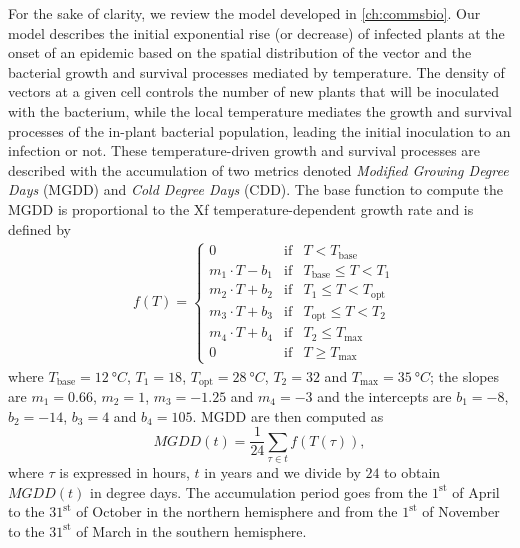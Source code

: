 For the sake of clarity, we review the model developed in \cref{ch:commsbio}.
Our model describes the initial exponential rise (or decrease) of infected
plants at the onset of an epidemic based on the spatial distribution of the
vector and the bacterial growth and survival processes mediated by temperature.
The density of vectors at a given cell controls the number of new plants that
will be inoculated with the bacterium, while the local temperature mediates the
growth and survival processes of the in-plant bacterial population, leading the
initial inoculation to an infection or not. These temperature-driven growth and
survival processes are described with the accumulation of two metrics denoted
\textit{Modified Growing Degree Days} (MGDD) and \textit{Cold Degree Days}
(CDD). The base function to compute the MGDD is proportional to the Xf
temperature-dependent growth rate and is defined by
\begin{align*}
     & f(T)=\left\{\begin{array}{lll}
                       0                & \textrm{if} & T<T_{\textrm{base}}
                       \\
                       m_1\cdot T-b_1   & \textrm{if} & T_{\textrm{base}} \leq
                       T < T_1
                       \\
                       m_2\cdot T + b_2 & \textrm{if} & T_{1} \leq T <
                       T_{\textrm{opt}}
                       \\
                       m_3\cdot T + b_3 & \textrm{if} & T_{\textrm{opt}}
                       \leq T
                       < T_2
                       \\
                       m_4\cdot T + b_4 & \textrm{if} & T_2 \leq
                       T_{\textrm{max}}
                       \\
                       0                & \textrm{if} & T\geq T_{\textrm{max}}
                   \end{array}\right. \,
\end{align*}
where $T_{\textrm{base}}=\SI{12}{\degree C}$, $T_1=18$,
$T_{\textrm{opt}}=\SI{28}{\degree C}$,	$T_2=32$ and
$T_{\textrm{max}}=\SI{35}{\degree C}$; the slopes are $m_1= 0.66$, $m_2=1$,
$m_3=-1.25$ and $m_4=-3$ and the intercepts are $b_1=-8$, $b_2=-14$, $b_3=4$
and $b_4=105$. MGDD are then computed as
\begin{equation*}
    MGDD(t) = \frac{1}{24}\sum_{\tau \in t} f(T(\tau)),
\end{equation*}
where $\tau$ is expressed in hours, $t$ in years and we divide by $24$ to
obtain $MGDD(t)$ in degree days. The accumulation period goes from the
$1^{\mathrm{st}}$ of April to the $31^{\mathrm{st}}$ of October in the northern
hemisphere and from the $1^{\mathrm{st}}$ of November to the $31^{\mathrm{st}}$
of March in the southern hemisphere.


